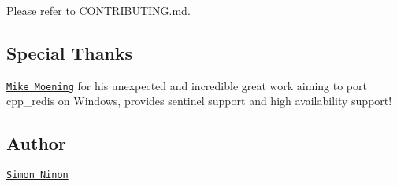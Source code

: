 Please refer to \mbox{\hyperlink{md_CONTRIBUTING}{C\+O\+N\+T\+R\+I\+B\+U\+T\+I\+NG.md}}.

\subsection*{Special Thanks}

\href{https://github.com/MikesAracade}{\tt Mike Moening} for his unexpected and incredible great work aiming to port cpp\+\_\+redis on Windows, provides sentinel support and high availability support!

\subsection*{Author}

\href{http://simon-ninon.fr}{\tt Simon Ninon} 